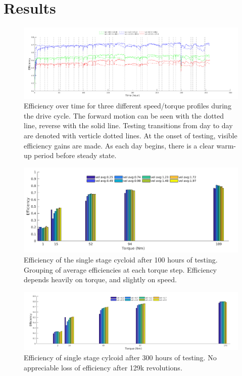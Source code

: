 \section{Results} \label{ch:single:eff_results}
\begin{figure}[t]
   \centering
   \includegraphics[width=\linewidth]{fig/total_runtime}
   \caption{Efficiency over time for three different speed/torque profiles during the drive cycle.
   The forward motion can be seen with the dotted line, reverse with the solid line.
   Testing transitions from day to day are denoted with verticle dotted lines.
   At the onset of testing, visible efficiency gains are made.
   As each day begins, there is a clear warm-up period before steady state.
   }
   \label{fig:long_run}
\end{figure}

\begin{figure}[t]
   \centering
   \includegraphics[width=0.8\linewidth]{fig/eff_test_bar_plot_v3}
   \caption{Efficiency of the single stage cycloid after 100 hours of testing. Grouping of average efficiencies at each torque step.
   Efficiency depends heavily on torque, and slightly on speed.}
   \label{fig:eff_results}
\end{figure}

\begin{figure}[t]
   \centering
   \includegraphics[width=0.8\linewidth]{fig/eff_final}
   \caption{Efficiency of single stage cylcoid after 300 hours of testing. No appreciable loss of efficiency after 129k revolutions.}
   \label{fig:eff_results_final}
\end{figure}


